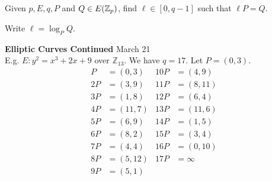 \documentclass[a4paper,12pt]{article}
\begin{document}
Given $p,E,q, P$ and $Q \in E(\mathbb{Z}_p)$, find $\ell \in [ 0, q-1]$
such that
$\ell P = Q$.

Write $\ell = \log_PQ$.

\clearpage

{\bf Elliptic Curves Continued} \hfill March 21
\\[1em]
E.g. $E:y^{2}=x^3 + 2x+9$ over $\mathbb{Z}_{13}$.  We have $q=17$.
Let $P=(0,3)$.
\begin{align*}
P &= (0, 3)    &10P &= (4, 9)\\
2P &= (3, 9)   &11P &= (8, 11)\\
3P &= (1, 8)   &12P &= (6, 4)\\
4P &= (11, 7)  &13P &= (11, 6)\\
5P &= (6, 9)   &14P &= (1, 5)\\
6P &= (8, 2)   &15P &= (3, 4)\\
7P &= (4, 4)   &16P &= (0, 10)\\
8P &= (5, 12)  &17P &=\infty \\
9P &= (5, 1)   &    &
\end{align*}
\end{document}
